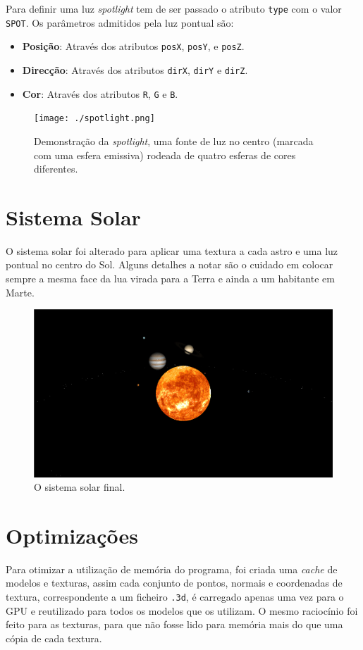 \documentclass[a4paper]{article}
\begin{document}
Para definir uma luz \textit{spotlight} tem de ser passado o atributo
\texttt{type} com o valor \texttt{SPOT}. Os parâmetros admitidos pela luz
pontual são:

\begin{itemize}
    \item \textbf{Posição}: Através dos atributos \texttt{posX}, \texttt{posY},
        e \texttt{posZ}.
    \item \textbf{Direcção}: Através dos atributos \texttt{dirX}, \texttt{dirY}
        e \texttt{dirZ}.
    \item \textbf{Cor}: Através dos atributos \texttt{R}, \texttt{G} e
        \texttt{B}.
\end{itemize}

\begin{figure}[H]
    \centering
    \texttt{[image: ./spotlight.png]}
    \caption{Demonstração da \textit{spotlight}, uma fonte de luz no centro (marcada
    com uma esfera emissiva) rodeada de quatro esferas de cores diferentes.}
\end{figure}
\section{Sistema Solar}
O sistema solar foi alterado para aplicar uma textura a cada astro e uma luz
pontual no centro do Sol. Alguns detalhes a notar são o cuidado em colocar sempre
a mesma face da lua virada para a Terra e ainda a um habitante em Marte.

\begin{figure}[H]
    \includegraphics[width=\textwidth]{solarsystem.png}
    \caption{O sistema solar final.}
\end{figure}

\section{Optimizações}
Para otimizar a utilização de memória do programa, foi criada uma
\textit{cache} de modelos e texturas, assim cada conjunto de pontos, normais e
coordenadas de textura, correspondente a um ficheiro \texttt{.3d}, é carregado
apenas uma vez para o GPU e reutilizado para todos os modelos que os utilizam.
O mesmo raciocínio foi feito para as texturas, para que não fosse lido para
memória mais do que uma cópia de cada textura.
\end{document}
